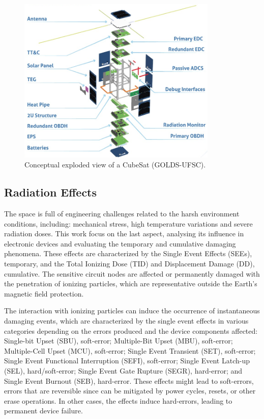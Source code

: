 \begin{figure}[!ht]
    \begin{center}
        \includegraphics[width=0.85\textwidth]{figures/exploded_view.png}
        \caption{Conceptual exploded view of a CubeSat (GOLDS-UFSC).}
        \label{fig:exploded_view}
    \end{center}
\end{figure}


\subsection{Radiation Effects}

The space is full of engineering challenges related to the harsh environment conditions, including: mechanical stress, high temperature variations and severe radiation doses. This work focus on the last aspect, analysing its influence in electronic devices and evaluating the temporary and cumulative damaging phenomena. These effects are characterized by the Single Event Effects (SEEs), temporary, and the Total Ionizing Dose (TID) and Displacement Damage (DD), cumulative. The sensitive circuit nodes are affected or permanently damaged with the penetration of ionizing particles, which are representative outside the Earth's magnetic field protection.

The interaction with ionizing particles can induce the occurrence of instantaneous damaging events, which are characterized by the single event effects in various categories depending on the errors produced and the device components affected: Single-bit Upset (SBU), soft-error; Multiple-Bit Upset (MBU), soft-error; Multiple-Cell Upset (MCU), soft-error; Single Event Transient (SET), soft-error; Single Event Functional Interruption (SEFI), soft-error; Single Event Latch-up (SEL), hard/soft-error; Single Event Gate Rupture (SEGR), hard-error; and Single Event Burnout (SEB), hard-error. These effects might lead to soft-errors, errors that are reversible since can be mitigated by power cycles, resets, or other erase operations. In other cases, the effects induce hard-errors, leading to permanent device failure.

